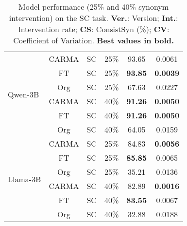 \begin{table}[h]
\begin{tabular}{|l|c|c|c|c|c|}
\multirow{6}{*}{Qwen-3B} 
& CARMA & SC & 25\% & 93.65 & 0.0061 \\
& FT & SC & 25\% & \textbf{93.85} & \textbf{0.0039} \\
& Org & SC & 25\% & 67.63 & 0.0227 \\
\cline{2-6}
& CARMA & SC & 40\% & \textbf{91.26} & \textbf{0.0050} \\
& FT & SC & 40\% & \textbf{91.26 }& \textbf{0.0050} \\
& Org & SC & 40\% & 64.05 & 0.0159 \\
\hline


\multirow{6}{*}{Llama-3B} 
& CARMA & SC & 25\% & 84.83 & \textbf{0.0056} \\
& FT & SC & 25\% & \textbf{85.85} & 0.0065 \\
& Org & SC & 25\% & 35.21 &0.0136 \\
\cline{2-6}
& CARMA & SC & 40\% & 82.89 & \textbf{0.0016} \\
& FT & SC & 40\% & \textbf{83.55} & 0.0067 \\
& Org & SC & 40\% & 32.88 &0.0188 \\
\hline
\end{tabular}
\caption{Model performance (25\% and 40\% synonym intervention) on the SC task. \textbf{Ver.}: Version; \textbf{Int.}: Intervention rate; \textbf{CS}: ConsistSyn (\%); \textbf{CV}: Coefficient of Variation. \textbf{Best values in bold.}}
\label{tab:synonym_results_appendix_SC}
\end{table}

